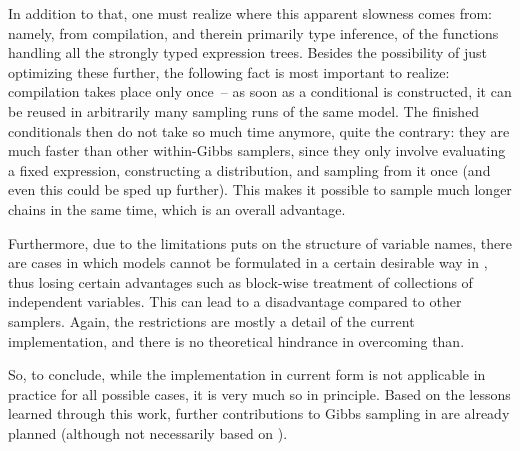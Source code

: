In addition to that, one must realize where this apparent slowness comes from: namely, from
compilation, and therein primarily type inference, of the functions handling all the strongly typed
expression trees.  Besides the possibility of just optimizing these further, the following fact is
most important to realize: compilation takes place only once~-- as soon as a conditional is
constructed, it can be reused in arbitrarily many sampling runs of the same model.  The finished
conditionals then do not take so much time anymore, quite the contrary: they are much faster than
other within-Gibbs samplers, since they only involve evaluating a fixed expression, constructing a
distribution, and sampling from it once (and even this could be sped up further).  This makes it
possible to sample much longer chains in the same time, which is an overall advantage.

Furthermore, due to the limitations \autogibbsjl{} puts on the structure of variable names, there
are cases in which models cannot be formulated in a certain desirable way in \dppljl{}, thus losing
certain advantages such as block-wise treatment of collections of independent variables.  This can
lead to a disadvantage compared to other samplers.  Again, the restrictions are mostly a detail of
the current implementation, and there is no theoretical hindrance in overcoming than.

So, to conclude, while the implementation in current form is not applicable in practice for all
possible cases, it is very much so in principle.  Based on the lessons learned through this work,
further contributions to Gibbs sampling in \turingjl{} are already planned (although not necessarily
based on \autogibbsjl{}).

